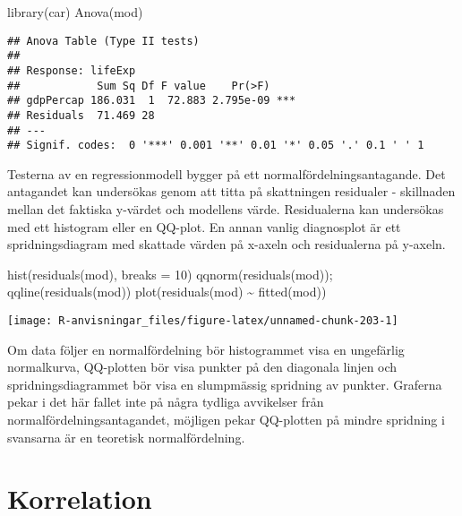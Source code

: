 \documentclass[
]{book}
\newenvironment{Shaded}{\begin{snugshade}}{\end{snugshade}}
\newcommand{\AttributeTok}[1]{\textcolor[rgb]{0.77,0.63,0.00}{#1}}
\newcommand{\DecValTok}[1]{\textcolor[rgb]{0.00,0.00,0.81}{#1}}
\newcommand{\FunctionTok}[1]{\textcolor[rgb]{0.00,0.00,0.00}{#1}}
\newcommand{\NormalTok}[1]{#1}
\newcommand{\SpecialCharTok}[1]{\textcolor[rgb]{0.00,0.00,0.00}{#1}}
\theoremstyle{definition}
\theoremstyle{definition}
\theoremstyle{definition}
\theoremstyle{definition}
\theoremstyle{remark}
\begin{document}
\begin{Shaded}
\begin{Highlighting}[]
\FunctionTok{library}\NormalTok{(car)}
\FunctionTok{Anova}\NormalTok{(mod)}
\end{Highlighting}
\end{Shaded}

\begin{verbatim}
## Anova Table (Type II tests)
## 
## Response: lifeExp
##            Sum Sq Df F value    Pr(>F)    
## gdpPercap 186.031  1  72.883 2.795e-09 ***
## Residuals  71.469 28                      
## ---
## Signif. codes:  0 '***' 0.001 '**' 0.01 '*' 0.05 '.' 0.1 ' ' 1
\end{verbatim}

Testerna av en regressionmodell bygger på ett normalfördelningsantagande. Det antagandet kan undersökas genom att titta på skattningen residualer - skillnaden mellan det faktiska y-värdet och modellens värde. Residualerna kan undersökas med ett histogram eller en QQ-plot. En annan vanlig diagnosplot är ett spridningsdiagram med skattade värden på x-axeln och residualerna på y-axeln.

\begin{Shaded}
\begin{Highlighting}[]
\FunctionTok{hist}\NormalTok{(}\FunctionTok{residuals}\NormalTok{(mod), }\AttributeTok{breaks =} \DecValTok{10}\NormalTok{)}
\FunctionTok{qqnorm}\NormalTok{(}\FunctionTok{residuals}\NormalTok{(mod)); }\FunctionTok{qqline}\NormalTok{(}\FunctionTok{residuals}\NormalTok{(mod))}
\FunctionTok{plot}\NormalTok{(}\FunctionTok{residuals}\NormalTok{(mod) }\SpecialCharTok{\textasciitilde{}} \FunctionTok{fitted}\NormalTok{(mod))}
\end{Highlighting}
\end{Shaded}

\begin{center}\texttt{[image: R-anvisningar\_files/figure-latex/unnamed-chunk-203-1]} \end{center}

Om data följer en normalfördelning bör histogrammet visa en ungefärlig normalkurva, QQ-plotten bör visa punkter på den diagonala linjen och spridningsdiagrammet bör visa en slumpmässig spridning av punkter. Graferna pekar i det här fallet inte på några tydliga avvikelser från normalfördelningsantagandet, möjligen pekar QQ-plotten på mindre spridning i svansarna är en teoretisk normalfördelning.

\hypertarget{korrelation}{%
\section{Korrelation}\label{korrelation}}
\end{document}
